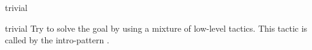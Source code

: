\begin{tactic}{trivial}
  \begin{tsyntax}[empty]{trivial}
  Try to solve the goal by using a mixture of low-level tactics.
  This tactic is called by the intro-pattern \ec{//}.
  \end{tsyntax}
\end{tactic}
